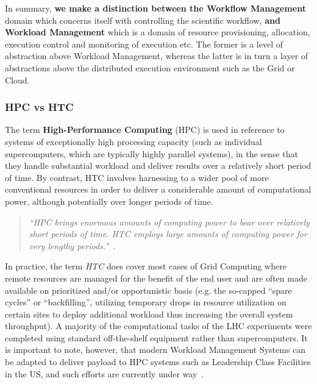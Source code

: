 In summary, \textbf{we make a distinction between the Workflow Management} domain which concerns itself with controlling the scientific workflow, \textbf{and Workload Management} which
is a domain of resource provisioning, allocation, execution control and monitoring of execution etc. The former is a level of abstraction above Workload Management, whereas the latter is in
turn a layer of abstractions above the distributed execution environment such as the Grid or Cloud.


\subsubsection{HPC vs HTC}
The term \textbf{High-Performance Computing} (HPC) is used in reference to systems of exceptionally high processing capacity (such as individual supercomputers, which are typically highly parallel systems),
in the sense that they handle substantial workload and deliver results over a relatively short period of time. By contrast, HTC involves harnessing to a wider pool
of more conventional resources in order to deliver a considerable amount of computational power, although potentially over longer periods of time. 
\begin{quote}
\textit{``HPC brings enormous amounts of computing power to bear over relatively short periods of time. HTC employs large amounts of computing power for very lengthy periods.''}~\cite{htc}.
\end{quote}

In practice, the term \textit{HTC} does cover most cases of Grid Computing where remote resources are managed for the benefit of the end user and are often made available on prioritized and/or
opportunistic basis (e.g. the so-capped ``spare cycles'' or ``backfilling'', utilizing temporary drops in resource utilization on certain sites to deploy additional workload thus increasing the overall system
throughput). A majority of the computational tasks of the LHC experiments were completed using standard off-the-shelf equipment rather than supercomputers. It is important to note, however,
that modern Workload Management Systems can be adapted to deliver payload to HPC systems such as Leadership Class Facilities in the US, and such efforts are currently under way~\cite{panda_chep13}.

